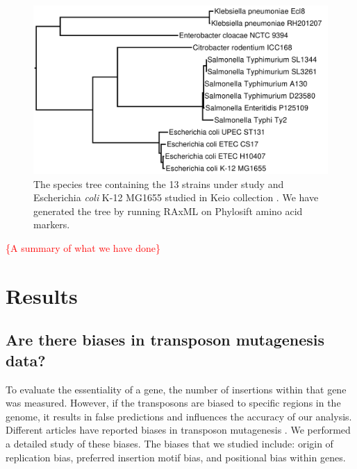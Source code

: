 \documentclass[12pt,letterpaper]{article}
\begin{document}
\begin{figure}
\includegraphics[scale=0.2]{phylosift-aa-raxmlbootstrap.pdf}
\caption{The species tree containing the 13 strains under study and Escherichia \textit{coli} K-12 MG1655 studied in Keio collection \cite{baba_construction_2006}. We have generated the tree by running RAxML \cite{stamatakis_raxml_2014} on Phylosift \cite{darling_phylosift:_2014} amino acid markers.}
\label{fig:species-tree}
\end{figure}

\textcolor{red}{\{A summary of what we have done\}}

\section{Results}

\subsection{Are there biases in transposon mutagenesis data?}
To evaluate the essentiality of a gene, the number of insertions within that gene was measured. However, if the transposons are biased to specific regions in the genome, it results in false predictions and influences the accuracy of our analysis. Different articles have reported biases in transposon mutagenesis \cite{barquist_comparison_2013, rubin_essential_2015, kimura_nucleoid_2016}. We performed a detailed study of these biases. The biases that we studied include: origin of replication bias, preferred insertion motif bias, and positional bias within genes.
\end{document}
